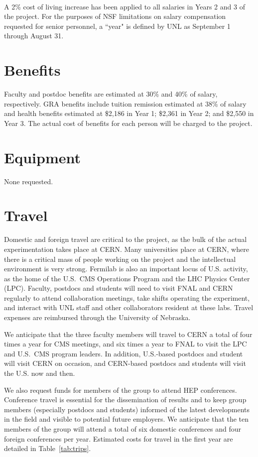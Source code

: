 \documentclass[11pt]{article}
\begin{document}
\paragraph{}
\noindent A 2\% cost of living increase has been applied to all salaries in Years 2
and 3 of the project.  For the purposes of NSF limitations on salary compensation requested for senior personnel, a ``year" is defined by UNL as September 1 through August 31.

\section{Benefits}
Faculty and postdoc benefits are estimated at 30\% and 40\% of salary,
respectively.  GRA benefits include tuition remission estimated at 38\% of
salary and health benefits estimated at \$2,186 in Year 1; \$2,361 in Year
2; and \$2,550 in Year 3. The actual cost of benefits for each person will
be charged to the project.

\section{Equipment} 
None requested.

\section{Travel}
Domestic and foreign travel are critical to the project, as the bulk of the
actual experimentation takes place at CERN.  Many universities place at
CERN, where there is a critical mass of people working on the project and
the intellectual environment is very strong.  Fermilab is also an important
locus of U.S. activity, as the home of the U.S.~CMS Operations Program and
the LHC Physics Center (LPC).  Faculty, postdocs and students will need to
visit FNAL and CERN regularly to attend collaboration meetings, take shifts
operating the experiment, and interact with UNL staff and other
collaborators resident at these labs.  Travel expenses are reimbursed
through the University of Nebraska.

We anticipate that the three faculty members will travel to CERN a
total of four times a year for CMS meetings, and six times a
year to FNAL to visit the LPC and U.S.~CMS program leaders.  In addition,
U.S.-based postdocs and student will visit CERN on occasion, and CERN-based
postdocs and students will visit the U.S. now and then.

We also request funds for members of the group to attend HEP conferences.
Conference travel is essential for the dissemination of results and to keep
group members (especially postdocs and students) informed of the latest
developments in the field and visible to potential future employers.  We
anticipate that the ten members of the group will attend a total of
six domestic conferences and four foreign conferences per year.  Estimated
costs for travel in the first year are detailed in Table~\ref{tab:trips}.
\end{document}

